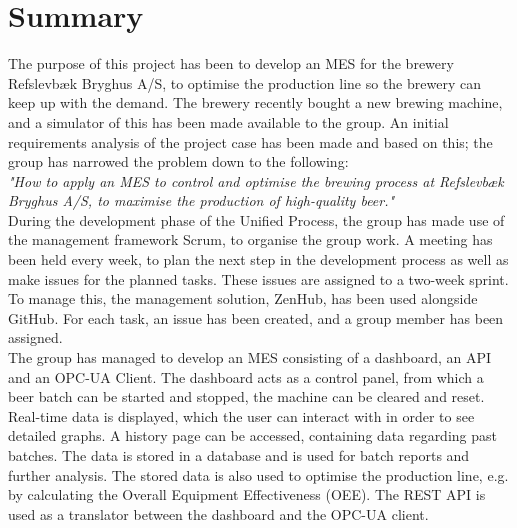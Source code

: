 \section{Summary}
The purpose of this project has been to develop an MES for the brewery
Refslevbæk Bryghus A/S, to optimise the production line so the brewery
can keep up with the demand. The brewery recently bought a new brewing machine,
and a simulator of this has been made available to the group. An initial
requirements analysis of the project case has been made and based on this; the
group has narrowed the problem down to the following:\\

\textit{"How to apply an MES to control and optimise the brewing process at
Refslevbæk Bryghus A/S, to maximise the production of high-quality beer."}\\

During the development phase of the Unified Process, the group has made use of
the management framework Scrum, to organise the group work. A meeting has been
held every week, to plan the next step in the development process as well as
make issues for the planned tasks. These issues are assigned to a two-week
sprint. To manage this, the management solution, ZenHub, has been used alongside
GitHub. For each task, an issue has been created, and a group member has been
assigned. \\

The group has managed to develop an MES consisting of a dashboard, an API and an
OPC-UA Client. The dashboard acts as a control panel, from which a beer batch
can be started and stopped, the machine can be cleared and reset. Real-time data
is displayed, which the user can interact with in order to see detailed graphs.
A history page can be accessed, containing data regarding past batches. The data
is stored in a database and is used for batch reports and further analysis. The
stored data is also used to optimise the production line, e.g. by
calculating the Overall Equipment Effectiveness (OEE). The REST API is used as a
translator between the dashboard and the OPC-UA client.